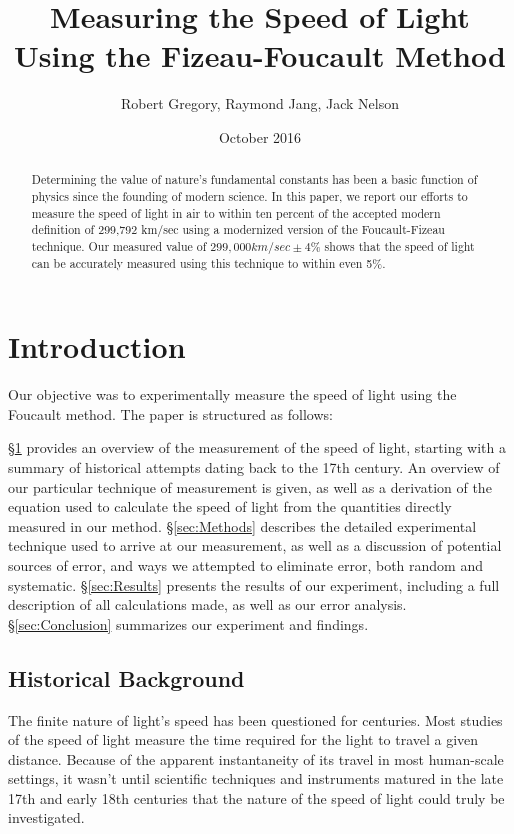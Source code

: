 \documentclass[twocolumn]{article}
\begin{document}
	
\title{Measuring the Speed of Light Using the Fizeau-Foucault Method}
\author{Robert Gregory, Raymond Jang, Jack Nelson}
\date{October 2016}

\maketitle
\begin{abstract}
	Determining the value of nature's fundamental constants has been a basic function of physics since the founding of modern science.
	In this paper, we report our efforts to measure the speed of light in air to within ten percent of the accepted modern definition of 299,792 km/sec using a modernized version of the Foucault-Fizeau technique.
	Our measured value of $299,000 km/sec \pm 4\%$ shows that the speed of light can be accurately measured using this technique to within even 5\%.
\end{abstract}	
\section{Introduction}
	\label{sec:Intro}
	Our objective was to experimentally measure the speed of light using the Foucault method. 
	The paper is structured as follows:
	
	\S\ref{sec:Intro} provides an overview of the measurement of the speed of light, starting with a summary of historical attempts dating back to the 17th century.
	An overview of our particular technique of measurement is given, as well as a derivation of the equation used to calculate the speed of light from the quantities directly measured in our method.
	\S\ref{sec:Methods} describes the detailed experimental technique used to arrive at our measurement, as well as a discussion of potential sources of error, and ways we attempted to eliminate error, both random and systematic.
	\S\ref{sec:Results} presents the results of our experiment, including a full description of all calculations made, as well as our error analysis.
	\S\ref{sec:Conclusion} summarizes our experiment and findings.
		
	\subsection{Historical Background}
	
		The finite nature of light's speed has been questioned for centuries. 
		Most studies of the speed of light measure the time required for the light to travel a given distance. 
		Because of the apparent instantaneity of its travel in most human-scale settings, it wasn’t until scientific techniques and instruments matured in the late 17th and early 18th centuries that the nature of the speed of light could truly be investigated. 
		
\end{document}
